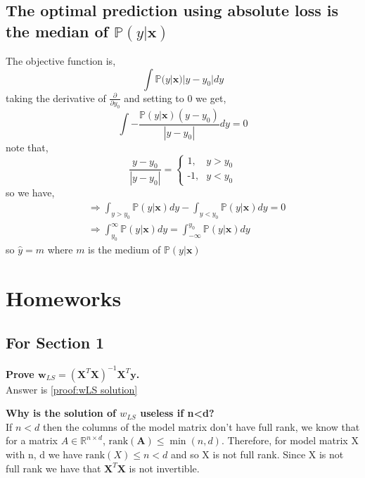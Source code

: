 \begin{appendices}
\subsection{The optimal prediction using absolute loss is the median of \texorpdfstring{$\mathbb{P}(y| \bm{x})$}{TEXT}} \label{proof:absolute-loss-optimal-classifier}
The objective function is,
\begin{equation}
    \int \mathbb{P}(y| \bm{x})|y-y_{0}| dy
\end{equation}
taking the derivative of $\frac{\partial}{\partial y_{0}}$ and setting to 0 we get,
\begin{equation}
    \int - \frac{\mathbb{P}(y| \bm{x}) (y-y_{0})}{|y-y_{0}|} dy = 0
\end{equation}
note that,
\begin{equation}
    \frac{y-y_{0}}{|y-y_{0}|} = \begin{cases} \mbox{1,} & y > y_{0} \\ \mbox{-1,} & y<y_{0} \end{cases}
\end{equation}
so we have,
\begin{align}
    &{} \Rightarrow \int_{y>y_{0}} \mathbb{P}(y|\bm{x}) dy - \int_{y<y_{0}} \mathbb{P}(y|\bm{x}) dy = 0 \\
    & \Rightarrow \int_{y_{0}}^{\infty} \mathbb{P}(y|\bm{x}) dy = \int_{- \infty}^{y_{0}} \mathbb{P}(y|\bm{x}) dy
\end{align}
so $\hat{y}=m$ where $m$ is the medium of $\mathbb{P}(y|\bm{x})$


\newpage
\section{Homeworks}
\subsection{For Section 1}
\begin{question}
    \textbf{Prove $\bm{w}_{LS} = (\bm{X}^{T} \bm{X})^{-1} \bm{X}^{T} \bm{y}$.} \\
    Answer is \cref{proof:wLS solution}
\end{question}

\begin{question}
    \textbf{Why is the solution of $w_{LS}$ useless if n<d?} \\
    If $n<d$ then the columns of the model matrix don't have full rank, we know that for a matrix $A \in \mathbb{R}^{n \times d} $, $\text{rank}(\bm{A}) \leq \min(n,d)$. Therefore, for model matrix X with n, d we have $\text{rank}(X) \leq n < d$ and so X is not full rank. Since X is not full rank we have that $\bm{X}^{T} \bm{X}$ is not invertible.
\end{question}


\end{appendices}
